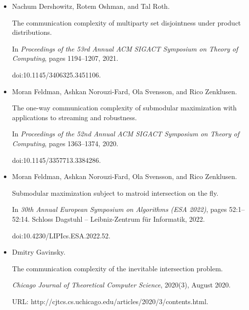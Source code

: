 \begin{itemize}
doi:10.4230/LIPIcs.FSTTCS.2023.24.





\item[] 
[23]

Nachum Dershowitz, Rotem Oshman, and Tal Roth.


The communication complexity of multiparty set disjointness under
product distributions.


In \emph{Proceedings of the 53rd Annual ACM SIGACT Symposium on Theory
of Computing}, pages 1194–1207, 2021.


doi:10.1145/3406325.3451106.





\item[] 
[24]

Moran Feldman, Ashkan Norouzi-Fard, Ola Svensson, and Rico Zenklusen.


The one-way communication complexity of submodular maximization with
applications to streaming and robustness.


In \emph{Proceedings of the 52nd Annual ACM SIGACT Symposium on Theory
of Computing}, pages 1363–1374, 2020.


doi:10.1145/3357713.3384286.





\item[] 
[25]

Moran Feldman, Ashkan Norouzi-Fard, Ola Svensson, and Rico Zenklusen.


Submodular maximization subject to matroid intersection on the fly.


In \emph{30th Annual European Symposium on Algorithms (ESA 2022)},
pages 52:1–52:14. Schloss Dagstuhl – Leibniz-Zentrum für Informatik,
2022.


doi:10.4230/LIPIcs.ESA.2022.52.





\item[] 
[26]

Dmitry Gavinsky.


The communication complexity of the inevitable intersection problem.


\emph{Chicago Journal of Theoretical Computer Science}, 2020(3),
August 2020.


URL:
http://cjtcs.cs.uchicago.edu/articles/2020/3/contents.html.






\end{itemize}
